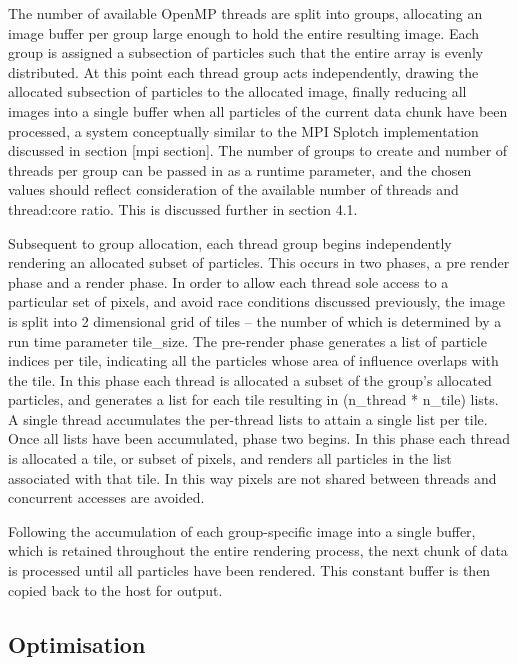 \documentclass[runningheads,a4paper]{llncs}
\begin{document}
The number of available OpenMP threads are split into groups, allocating an image buffer per group large enough to hold 
the entire resulting image. Each group is assigned a subsection of particles such that the entire array is evenly distributed. 
At this point each thread group acts independently, drawing the allocated subsection of particles to the allocated image, finally 
reducing all images into a single buffer when all particles of the current data chunk have been processed, a system 
conceptually similar to the MPI Splotch implementation discussed in section [mpi section]. The number of groups to create and 
number of threads per group can be passed in as a runtime parameter, and the chosen values should reflect consideration 
of the available number of threads and thread:core ratio. This is discussed further in section 4.1.

Subsequent to group allocation, each thread group begins independently rendering an allocated subset of particles. This 
occurs in two phases, a pre render phase and a render phase. In order to allow each thread sole access to a particular 
set of pixels, and avoid race conditions discussed previously, the image is split into 2 dimensional grid of tiles – 
the number of which is determined by a run time parameter tile\_size. The pre-render phase generates a list of particle 
indices per tile, indicating all the particles whose area of influence overlaps with the tile. In this phase each thread 
is allocated a subset of the group's allocated particles, and generates a list for each tile resulting in 
(n\_thread * n\_tile) lists. A single thread accumulates the per-thread lists to attain a single list per tile. 
Once all lists have been accumulated, phase two begins. In this phase each thread is allocated a tile, or subset of 
pixels, and renders all particles in the list associated with that tile. In this way pixels are not shared between 
threads and concurrent accesses are avoided.

Following the accumulation of each group-specific image into a single buffer, which is retained throughout the entire 
rendering process, the next chunk of data is processed until all particles have been rendered. This constant buffer is 
then copied back to the host for output. 



\subsection{Optimisation}
\label{sect:micoptimisation}
\end{document}
